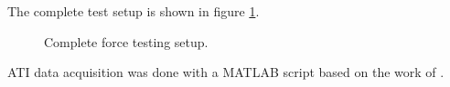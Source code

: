 The complete test setup is shown in figure \ref{fig: Force_test_setup}.
\begin{figure}
    \centering
    \caption{Complete force testing setup.}
    \label{fig: Force_test_setup}
\end{figure}

ATI data acquisition was done with a MATLAB script based on the work of \cite{ATI_NetFT_MatlabInterface}.

